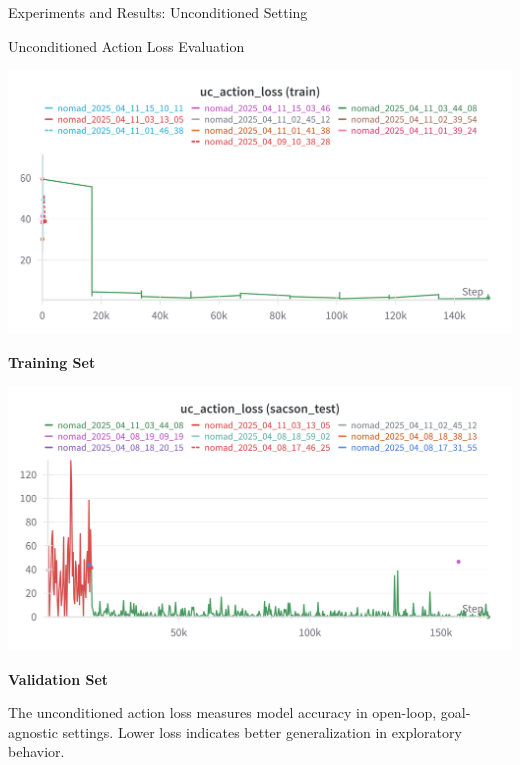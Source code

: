 \documentclass{beamer}
\begin{document}
    \begin{frame}{Experiments and Results: Unconditioned Setting}
        \begin{block}{Unconditioned Action Loss Evaluation}
            \begin{minipage}{0.48\textwidth}
                \centering
                \includegraphics[width=\textwidth]{images/uc_action_train.png}
                
                \textbf{Training Set}
            \end{minipage}
            \hfill
            \begin{minipage}{0.48\textwidth}
                \centering
                \includegraphics[width=\textwidth]{images/uc_action_test.png}
                
                \textbf{Validation Set}
            \end{minipage}
            
            \vspace{0.5em}
            \bigskip
            The unconditioned action loss measures model accuracy in open-loop, goal-agnostic settings. Lower loss indicates better generalization in exploratory behavior.
        \end{block}
    \end{frame}
\end{document}
